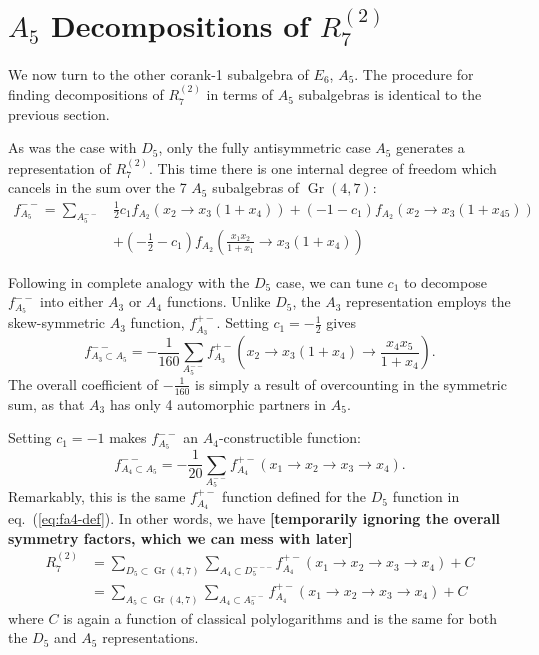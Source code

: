 \documentclass[11pt]{article}
\DeclareMathOperator{\Gr}{Gr}
\def\nl{\nonumber\\}
\def\draftnote#1{{\bf [#1]}}
\def\pdfeq#1{\texorpdfstring{$#1$}{a}}
\begin{document}
\section{\pdfeq{A_5} Decompositions of \pdfeq{R^{(2)}_7}}\label{sec:a5-func}

We now turn to the other corank-1 subalgebra of $E_6$, $A_5$. The procedure for finding decompositions of $R^{(2)}_7$ in terms of $A_5$ subalgebras is identical to the previous section. 

As was the case with $D_5$, only the fully antisymmetric case $A_5$ generates a representation of $R^{(2)}_7$. This time there is one internal degree of freedom which cancels in the sum over the 7 $A_5$ subalgebras of $\Gr(4,7)$:
\begin{align}
	f_{A_5}^{--} = \sum_{A_5^{--}} 
	& \frac{1}{2} c_1 f_{A_2}\left(x_2\to x_3 \left(1+x_4\right)\right)
	+\left(-1-c_1\right) f_{A_2}\left(x_2\to x_3 \left(1+x_{45}\right)\right)\nl
	&+\left(-\frac{1}{2}-c_1\right) f_{A_2}\left(\frac{x_1 x_2}{1+x_1}\to x_3 \left(1+x_4\right)\right)
\end{align}

Following in complete analogy with the $D_5$ case, we can tune $c_1$ to decompose $f_{A_5}^{--}$ into either $A_3$ or $A_4$ functions. Unlike $D_5$, the $A_3$ representation employs the skew-symmetric $A_3$ function, $f_{A_3}^{+-}$. Setting $c_1 = -\frac{1}{2}$ gives
\begin{equation}
	f_{A_3\subset A_5}^{--} = -\frac{1}{160}\sum_{A_5^{--}} f_{A_3}^{+-}\left(x_2\to x_3(1+x_4)\to \frac{x_4 x_5}{1+x_4}\right).
\end{equation}
The overall coefficient of $-\frac{1}{160}$ is simply a result of overcounting in the symmetric sum, as that $A_3$ has only 4 automorphic partners in $A_5$.

Setting $c_1 = -1$ makes $f_{A_5}^{--}$ an $A_4$-constructible function:
\begin{equation}
	f_{A_4\subset A_5}^{--} = -\frac{1}{20} \sum_{A_5^{--}} f_{A_4}^{+-}(x_1\to x_2 \to x_3 \to x_4).
\end{equation}
Remarkably, this is the same $f_{A_4}^{+-}$ function defined for the $D_5$ function in eq.~(\ref{eq:fa4-def}). In other words, we have \draftnote{temporarily ignoring the overall symmetry factors, which we can mess with later}
\begin{align}
	R^{(2)}_7 &= \sum_{D_5\subset \Gr(4,7)} \sum_{A_4\subset D_5^{---}} f_{A_4}^{+-}(x_1\to x_2 \to x_3 \to x_4) +C \\
	& = \sum_{A_5\subset \Gr(4,7)} \sum_{A_4\subset A_5^{--}} f_{A_4}^{+-}(x_1\to x_2 \to x_3 \to x_4) + C
\end{align}
where $C$ is again a function of classical polylogarithms and is the same for both the $D_5$ and $A_5$ representations. 
\end{document}
